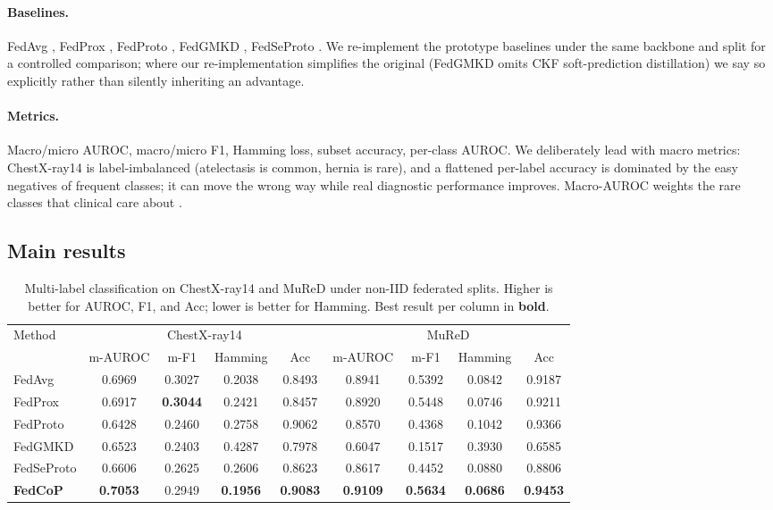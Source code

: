 \documentclass[11pt,a4paper]{article}
\theoremstyle{definition}
\begin{document}
\paragraph{Baselines.} FedAvg \citep{mcmahan2017fedavg}, FedProx \citep{li2020fedprox}, FedProto \citep{tan2022fedproto}, FedGMKD \citep{zhang2024fedgmkd}, FedSeProto \citep{fedseproto2024}. We re-implement the prototype baselines under the same backbone and split for a controlled comparison; where our re-implementation simplifies the original (FedGMKD omits CKF soft-prediction distillation) we say so explicitly rather than silently inheriting an advantage.

\paragraph{Metrics.} Macro/micro AUROC, macro/micro F1, Hamming loss, subset accuracy, per-class AUROC. We deliberately lead with macro metrics: ChestX-ray14 is label-imbalanced (atelectasis is common, hernia is rare), and a flattened per-label accuracy is dominated by the easy negatives of frequent classes; it can move the wrong way while real diagnostic performance improves. Macro-AUROC weights the rare classes that clinical care about \citep{rajpurkar2017chexnet,irvin2019chexpert}.

\subsection{Main results}

\begin{table}[t]
\centering
\caption{Multi-label classification on ChestX-ray14 and MuReD under non-IID federated splits. Higher is better for AUROC, F1, and Acc; lower is better for Hamming. Best result per column in \textbf{bold}.}
\label{tab:main}
\footnotesize
\setlength{\tabcolsep}{4pt}
\begin{tabular}{lcccc|cccc}
\toprule
\multirow{2}{*}{Method} & \multicolumn{4}{c}{ChestX-ray14} & \multicolumn{4}{c}{MuReD} \\
\cmidrule(lr){2-5}\cmidrule(lr){6-9}
 & m-AUROC & m-F1 & Hamming & Acc & m-AUROC & m-F1 & Hamming & Acc \\
\midrule
FedAvg    & 0.6969 & 0.3027 & 0.2038 & 0.8493 & 0.8941 & 0.5392 & 0.0842 & 0.9187 \\
FedProx   & 0.6917 & \textbf{0.3044} & 0.2421 & 0.8457 & 0.8920 & 0.5448 & 0.0746 & 0.9211 \\
FedProto  & 0.6428 & 0.2460 & 0.2758 & 0.9062 & 0.8570 & 0.4368 & 0.1042 & 0.9366 \\
FedGMKD   & 0.6523 & 0.2403 & 0.4287 & 0.7978 & 0.6047 & 0.1517 & 0.3930 & 0.6585 \\
FedSeProto& 0.6606 & 0.2625 & 0.2606 & 0.8623 & 0.8617 & 0.4452 & 0.0880 & 0.8806 \\
\midrule
\textbf{FedCoP} & \textbf{0.7053} & 0.2949 & \textbf{0.1956} & \textbf{0.9083} & \textbf{0.9109} & \textbf{0.5634} & \textbf{0.0686} & \textbf{0.9453} \\
\bottomrule
\end{tabular}
\end{table}
\end{document}
